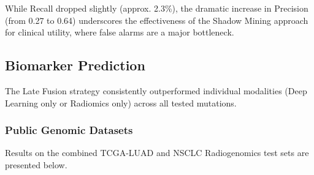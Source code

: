 \documentclass[10pt, twocolumn, letterpaper]{article}
\begin{document}
\begin{table}[h]
\centering
\caption{Segmentation Performance Comparison}
\label{tab:seg_results}
\end{table}

While Recall dropped slightly (approx. 2.3\%), the dramatic increase in Precision (from 0.27 to 0.64) underscores the effectiveness of the Shadow Mining approach for clinical utility, where false alarms are a major bottleneck.

\subsection{Biomarker Prediction}
The Late Fusion strategy consistently outperformed individual modalities (Deep Learning only or Radiomics only) across all tested mutations.

\subsubsection{Public Genomic Datasets}
Results on the combined TCGA-LUAD and NSCLC Radiogenomics test sets are presented below.

\begin{table}[h]
\centering
\caption{Biomarker Prediction (Public Data)}
\label{tab:biomarker_public}
\end{table}
\end{document}
